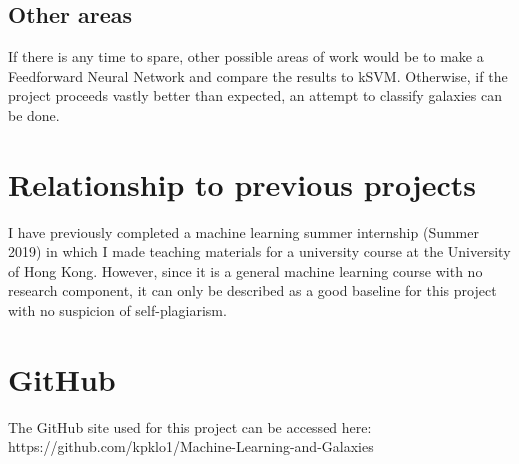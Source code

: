 \documentclass[a4paper,11pt]{article}
\begin{document}
\subsection{Other areas}
If there is any time to spare, other possible areas of work would be to make a Feedforward Neural Network and compare the results to kSVM. Otherwise, if the project proceeds vastly better than expected, an attempt to classify galaxies can be done.
\newpage






\newpage 
\begin{appendix}

\section{Relationship to previous projects}
I have previously completed a machine learning summer internship (Summer 2019) in which I made teaching materials for a university course at the University of Hong Kong. However, since it is a general machine learning course with no research component, it can only be described as a good baseline for this project with no suspicion of self-plagiarism.
\newpage

\section{GitHub}
The GitHub site used for this project can be accessed here: https://github.com/kpklo1/Machine-Learning-and-Galaxies

\end{appendix}
\end{document}
